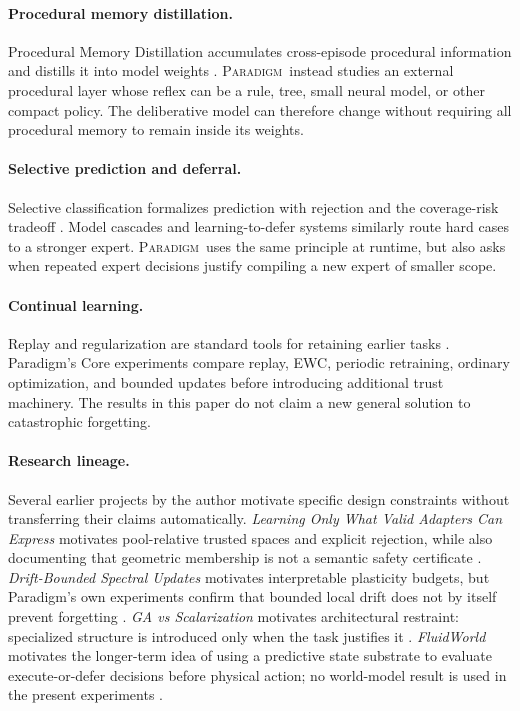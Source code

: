 \documentclass[10pt]{article}
\newcommand{\paradigm}{\textsc{Paradigm}}
\begin{document}
\paragraph{Procedural memory distillation.}
Procedural Memory Distillation accumulates cross-episode procedural information and distills it into model weights \cite{liu2026pmd}. \paradigm\ instead studies an external procedural layer whose reflex can be a rule, tree, small neural model, or other compact policy. The deliberative model can therefore change without requiring all procedural memory to remain inside its weights.

\paragraph{Selective prediction and deferral.}
Selective classification formalizes prediction with rejection and the coverage-risk tradeoff \cite{geifman2017selective}. Model cascades and learning-to-defer systems similarly route hard cases to a stronger expert. \paradigm\ uses the same principle at runtime, but also asks when repeated expert decisions justify compiling a new expert of smaller scope.

\paragraph{Continual learning.}
Replay and regularization are standard tools for retaining earlier tasks \cite{chaudhry2019replay,kirkpatrick2017ewc}. Paradigm's Core experiments compare replay, EWC, periodic retraining, ordinary optimization, and bounded updates before introducing additional trust machinery. The results in this paper do not claim a new general solution to catastrophic forgetting.

\paragraph{Research lineage.}
Several earlier projects by the author motivate specific design constraints without transferring their claims automatically. \emph{Learning Only What Valid Adapters Can Express} motivates pool-relative trusted spaces and explicit rejection, while also documenting that geometric membership is not a semantic safety certificate \cite{polly2026validadapters}. \emph{Drift-Bounded Spectral Updates} motivates interpretable plasticity budgets, but Paradigm's own experiments confirm that bounded local drift does not by itself prevent forgetting \cite{polly2026drift}. \emph{GA vs Scalarization} motivates architectural restraint: specialized structure is introduced only when the task justifies it \cite{polly2026ga}. \emph{FluidWorld} motivates the longer-term idea of using a predictive state substrate to evaluate execute-or-defer decisions before physical action; no world-model result is used in the present experiments \cite{polly2026fluidworld}.
\end{document}
